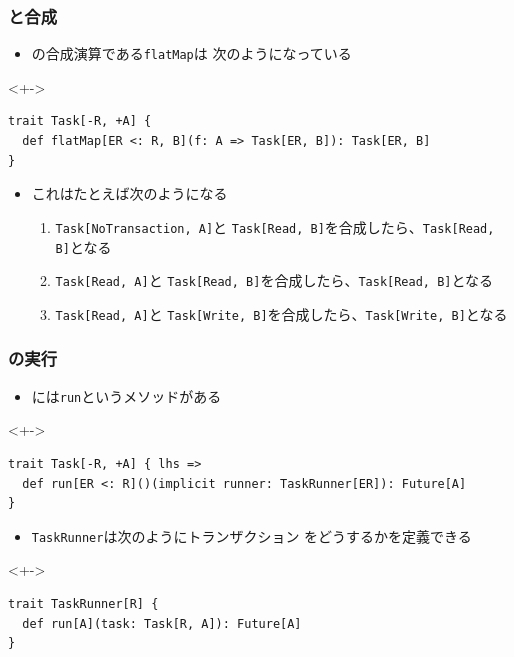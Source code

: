 \begin{frame}[fragile]
  \frametitle{\Fujitask と合成}
 
  \pause
  \begin{itemize}
    \item<+-> \Fujitask の合成演算である\lstinline|flatMap|は
    次のようになっている
  \end{itemize}
    
  \begin{uncoverenv}<+->
\begin{lstlisting}[style=scala]
trait Task[-R, +A] {
  def flatMap[ER <: R, B](f: A => Task[ER, B]): Task[ER, B]
}
\end{lstlisting}
  \end{uncoverenv}
 
  \begin{itemize}
    \item<+-> これはたとえば次のようになる
    \begin{enumerate}
      \item<+-> \lstinline|Task[NoTransaction, A]|と
      \lstinline|Task[Read, B]|を合成したら、\lstinline|Task[Read, B]|となる
 
      \item<+-> \lstinline|Task[Read, A]|と
      \lstinline|Task[Read, B]|を合成したら、\lstinline|Task[Read, B]|となる
 
      \item<+-> \lstinline|Task[Read, A]|と
      \lstinline|Task[Write, B]|を合成したら、\lstinline|Task[Write, B]|となる
    \end{enumerate}
  \end{itemize}
\end{frame}

\begin{frame}[fragile]
  \frametitle{\Fujitask の実行}

  \pause
  \begin{itemize}
    \item<+-> \Fujitask には\lstinline|run|というメソッドがある
  \end{itemize}
  
  \begin{uncoverenv}<+->
\begin{lstlisting}[style=scala]
trait Task[-R, +A] { lhs =>
  def run[ER <: R]()(implicit runner: TaskRunner[ER]): Future[A]
}
\end{lstlisting}
  \end{uncoverenv}

  \begin{itemize}
    \item<+-> \lstinline|TaskRunner|は次のようにトランザクション
    をどうするかを定義できる
  \end{itemize}

  \begin{uncoverenv}<+->
\begin{lstlisting}[style=scala]
trait TaskRunner[R] {
  def run[A](task: Task[R, A]): Future[A]
}
\end{lstlisting}
  \end{uncoverenv}
\end{frame}

